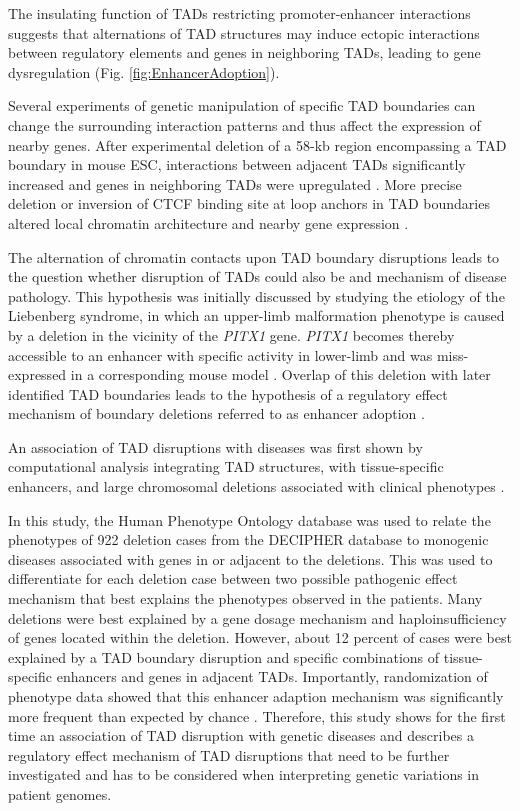 \documentclass[a4paper,twoside=true,openright,parskip=full,chapterprefix=true,11pt,headings=normal,bibliography=totoc,listof=totoc,titlepage=on,captions=tableabove,draft=false]{scrreprt}
\theoremstyle{definition}
\theoremstyle{definition}
\theoremstyle{definition}
\theoremstyle{remark}
\begin{document}
The insulating function of TADs restricting promoter-enhancer
interactions \citep{Symmons2014} suggests that alternations of TAD
structures may induce ectopic interactions between regulatory elements
and genes in neighboring TADs, leading to gene dysregulation (Fig.
\ref{fig:EnhancerAdoption}).

Several experiments of genetic manipulation of specific TAD boundaries
can change the surrounding interaction patterns and thus affect the
expression of nearby genes. After experimental deletion of a 58-kb
region encompassing a TAD boundary in mouse ESC, interactions between
adjacent TADs significantly increased and genes in neighboring TADs were
upregulated \citep{Nora2012}. More precise deletion or inversion of CTCF
binding site at loop anchors in TAD boundaries altered local chromatin
architecture and nearby gene expression
\citep{Dowen2014, Guo2015, Narendra2015}.

The alternation of chromatin contacts upon TAD boundary disruptions
leads to the question whether disruption of TADs could also be and
mechanism of disease pathology. This hypothesis was initially discussed
by studying the etiology of the Liebenberg syndrome, in which an
upper-limb malformation phenotype is caused by a deletion in the
vicinity of the \emph{PITX1} gene. \emph{PITX1} becomes thereby
accessible to an enhancer with specific activity in lower-limb and was
miss-expressed in a corresponding mouse model \citep{Spielmann2012}.
Overlap of this deletion with later identified TAD boundaries leads to
the hypothesis of a regulatory effect mechanism of boundary deletions
referred to as enhancer adoption \citep{Spielmann2013a}.

An association of TAD disruptions with diseases was first shown by
computational analysis integrating TAD structures, with tissue-specific
enhancers, and large chromosomal deletions associated with clinical
phenotypes \citep{Ibn-Salem2014}.

In this study, the Human Phenotype Ontology database \citep{Kohler2014}
was used to relate the phenotypes of 922 deletion cases from the
DECIPHER database \citep{Firth2009} to monogenic diseases associated
with genes in or adjacent to the deletions. This was used to
differentiate for each deletion case between two possible pathogenic
effect mechanism that best explains the phenotypes observed in the
patients. Many deletions were best explained by a gene dosage mechanism
and haploinsufficiency of genes located within the deletion. However,
about 12 percent of cases were best explained by a TAD boundary
disruption and specific combinations of tissue-specific enhancers and
genes in adjacent TADs. Importantly, randomization of phenotype data
showed that this enhancer adaption mechanism was significantly more
frequent than expected by chance \citep{Ibn-Salem2014}. Therefore, this
study shows for the first time an association of TAD disruption with
genetic diseases and describes a regulatory effect mechanism of TAD
disruptions that need to be further investigated and has to be
considered when interpreting genetic variations in patient genomes.
\end{document}
